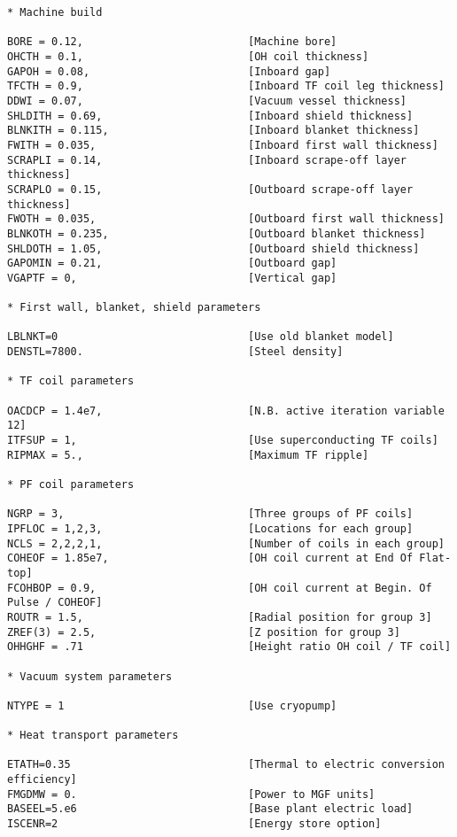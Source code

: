 \documentclass[11pt,a4paper]{report}
\begin{document}
\begin{verbatim}
* Machine build

BORE = 0.12,                          [Machine bore]
OHCTH = 0.1,                          [OH coil thickness]
GAPOH = 0.08,                         [Inboard gap]
TFCTH = 0.9,                          [Inboard TF coil leg thickness]
DDWI = 0.07,                          [Vacuum vessel thickness]
SHLDITH = 0.69,                       [Inboard shield thickness]
BLNKITH = 0.115,                      [Inboard blanket thickness]
FWITH = 0.035,                        [Inboard first wall thickness]
SCRAPLI = 0.14,                       [Inboard scrape-off layer thickness]
SCRAPLO = 0.15,                       [Outboard scrape-off layer thickness]
FWOTH = 0.035,                        [Outboard first wall thickness]
BLNKOTH = 0.235,                      [Outboard blanket thickness]
SHLDOTH = 1.05,                       [Outboard shield thickness]
GAPOMIN = 0.21,                       [Outboard gap]
VGAPTF = 0,                           [Vertical gap]

* First wall, blanket, shield parameters

LBLNKT=0                              [Use old blanket model]
DENSTL=7800.                          [Steel density]

* TF coil parameters

OACDCP = 1.4e7,                       [N.B. active iteration variable 12]
ITFSUP = 1,                           [Use superconducting TF coils]
RIPMAX = 5.,                          [Maximum TF ripple]

* PF coil parameters

NGRP = 3,                             [Three groups of PF coils]
IPFLOC = 1,2,3,                       [Locations for each group]
NCLS = 2,2,2,1,                       [Number of coils in each group]
COHEOF = 1.85e7,                      [OH coil current at End Of Flat-top]
FCOHBOP = 0.9,                        [OH coil current at Begin. Of Pulse / COHEOF]
ROUTR = 1.5,                          [Radial position for group 3]
ZREF(3) = 2.5,                        [Z position for group 3]
OHHGHF = .71                          [Height ratio OH coil / TF coil]

* Vacuum system parameters

NTYPE = 1                             [Use cryopump]

* Heat transport parameters

ETATH=0.35                            [Thermal to electric conversion efficiency]
FMGDMW = 0.                           [Power to MGF units]
BASEEL=5.e6                           [Base plant electric load]
ISCENR=2                              [Energy store option]


\end{verbatim}
\end{document}
